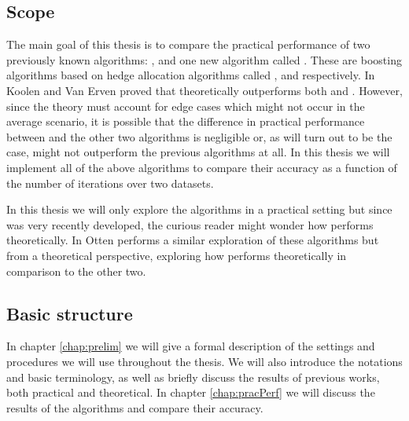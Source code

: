\subsection{Scope}

The main goal of this thesis is to compare the practical performance of two previously known algorithms: \adaB, \NHB and one new algorithm called \squintB. These are boosting algorithms based on hedge allocation algorithms called \hedge, \adaN and \squint respectively. In \cite{Koolen2015} Koolen and Van Erven proved that \squint theoretically outperforms both \hedge and \adaN. However, since the theory must account for edge cases which might not occur in the average scenario, it is possible that the difference in practical performance between \squint and the other two algorithms is negligible or, as will turn out to be the case, \squintB might not outperform the previous algorithms at all. In this thesis we will implement all of the above algorithms to compare their accuracy as a function of the number of iterations over two datasets.

\par In this thesis we will only explore the algorithms in a practical setting but since \squint was very recently developed, the curious reader might wonder how \squintB performs theoretically. In \cite{Otten2016} Otten performs a similar exploration of these algorithms but from a theoretical perspective, exploring how \squintB performs theoretically in comparison to the other two. 

\subsection{Basic structure}
In chapter \ref{chap:prelim} we will give a formal description of the settings and procedures we will use throughout the thesis. We will also introduce the notations and basic terminology, as well as briefly discuss the results of previous works, both practical and theoretical. In chapter \ref{chap:pracPerf} we will discuss the results of the algorithms and compare their accuracy.